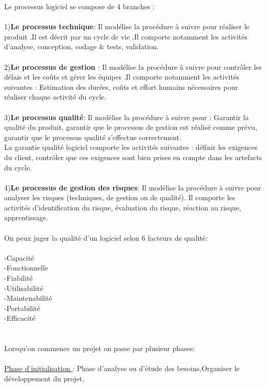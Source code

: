 \documentclass[a4paper,12pt,openany]{book}
\begin{document}
Le processus logiciel se compose de 4 branches : \\
\\
1)\textbf{Le processus technique}: Il modélise la procédure à suivre pour réaliser le produit .Il est décrit par un cycle de vie .Il comporte notamment les activités d'analyse, conception, codage \& tests, validation.\\
\\
2)\textbf{Le processus de gestion} : Il modélise la procédure à suivre pour contrôler les délais et les coûts et gérer les équipes .Il comporte notamment les activités suivantes : Estimation des durées, coûts et effort humains nécessaires pour réaliser chaque activité du cycle.\\
\\
3)\textbf{Le processus qualité}: Il modélise la procédure à suivre pour : Garantir la qualité du produit, garantir que le processus de gestion est réalisé comme prévu, garantir que le processus qualité s’effectue correctement.\\
La garantie qualité logiciel comporte les activités suivantes : définir les exigences du client, contrôler que ces exigences sont bien prises en compte dans les artefacts du cycle.\\
\\
4)\textbf{Le processus de gestion des risques}: Il modélise la procédure à suivre pour analyser les risques (techniques, de gestion ou de qualité). Il comporte les activités d'identification du risque, évaluation du risque, réaction au risque, apprentissage.\\
\\
On peux juger la qualité d'un logiciel selon 6 facteurs de qualité: \\
\\
-Capacité\\
-Fonctionnelle\\
-Fiabilité\\
-Utilisabilité\\
-Maintenabilité\\ 
-Portabilité\\
-Efficacité\\
\\
\\
Lorsqu'on commence un projet on passe par plusieur phases:\\
\\
\underline{Phase d'initialisation }: Phase d’analyse ou d’étude des besoins,Organiser le développement du projet.\\
\end{document}
